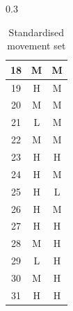 \begin{table}[h]
\begin{subtable}[t]{0.3\textwidth}
\begin{tabular}[t]{||c|c|c||}
      \hline
      18 & M & M \\
      \hline
      19 & H & M \\
      \hline
      20 & M & M \\
      \hline
      21 & L & M \\
      \hline
      22 & M & M \\
      \hline
      23 & H & H \\
      \hline
      24 & H & M \\
      \hline
      25 & H & L \\
      \hline
      26 & H & M \\
      \hline
      27 & H & H \\
      \hline
      28 & M & H \\
      \hline
      29 & L & H \\
      \hline
      30 & M & H \\
      \hline
      31 & H & H \\
      \hline
    \end{tabular}
    \end{subtable}
    \caption{Standardised movement set}
    \label{fig: standardised movement set}
\end{table}
